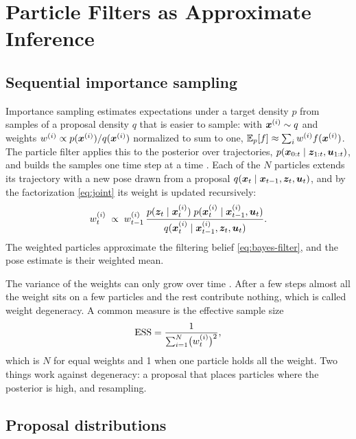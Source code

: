 \section{Particle Filters as Approximate Inference}\label{sec:particle-filters}

\subsection{Sequential importance sampling}

Importance sampling estimates expectations under a target density $p$ from samples of a proposal density $q$ that
is easier to sample: with $\bm{x}^{(i)} \sim q$ and weights $w^{(i)} \propto p(\bm{x}^{(i)}) / q(\bm{x}^{(i)})$ normalized to sum
to one, $\mathbb{E}_p[f] \approx \sum_i w^{(i)} f(\bm{x}^{(i)})$. The particle filter applies this to the posterior over
trajectories, $p(\bm{x}_{0:t} \mid \bm{z}_{1:t}, \bm{u}_{1:t})$, and builds the samples one time step at a time
\cite{arulampalam2002tutorial,doucet2011tutorial}. Each of the $N$ particles extends its trajectory with a new pose
drawn from a proposal $q(\bm{x}_t \mid \bm{x}_{t-1}, \bm{z}_t, \bm{u}_t)$, and by the factorization \eqref{eq:joint} its weight
is updated recursively:
\begin{equation}
  w_t^{(i)} \;\propto\; w_{t-1}^{(i)}\,
  \frac{p(\bm{z}_t \mid \bm{x}_t^{(i)})\; p(\bm{x}_t^{(i)} \mid \bm{x}_{t-1}^{(i)}, \bm{u}_t)}
       {q(\bm{x}_t^{(i)} \mid \bm{x}_{t-1}^{(i)}, \bm{z}_t, \bm{u}_t)}.
  \label{eq:weight}
\end{equation}
The weighted particles approximate the filtering belief \eqref{eq:bayes-filter}, and the pose estimate is their
weighted mean.

The variance of the weights can only grow over time \cite{doucet2011tutorial}. After a few steps almost all the
weight sits on a few particles and the rest contribute nothing, which is called weight degeneracy. A common measure
is the effective sample size
\begin{equation}
  \mathrm{ESS} = \frac{1}{\sum_{i=1}^{N} \bigl(w_t^{(i)}\bigr)^2},
  \label{eq:ess}
\end{equation}
which is $N$ for equal weights and 1 when one particle holds all the weight. Two things work against degeneracy: a
proposal that places particles where the posterior is high, and resampling.

\subsection{Proposal distributions}

